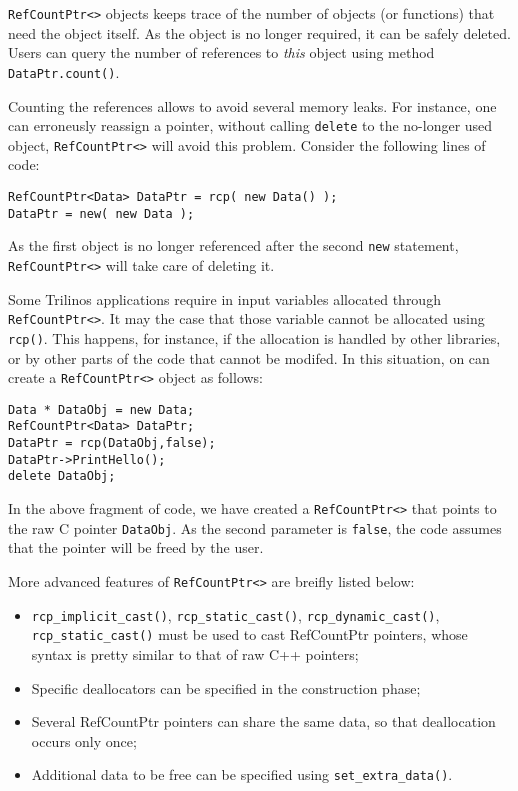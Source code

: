 \verb!RefCountPtr<>! objects keeps trace of the number of objects (or
functions) that need the object itself. As the object is no longer
required, it can be safely deleted. Users can query the number of
references to {\sl this} object using method \verb!DataPtr.count()!.

Counting the references allows to avoid several memory leaks. For
instance, one can erroneusly reassign a pointer, without calling
\verb!delete! to the no-longer used object, \verb!RefCountPtr<>! will
avoid this problem. Consider the following lines of code:
\begin{verbatim}
RefCountPtr<Data> DataPtr = rcp( new Data() );    
DataPtr = new( new Data );
\end{verbatim}
As the first object is no longer referenced after the second \verb!new!
statement, \verb!RefCountPtr<>! will take care of deleting it.

Some Trilinos applications require in input variables allocated through
\verb!RefCountPtr<>!. It may the case that those variable cannot be
allocated using \verb!rcp()!. This happens, for instance, if the
allocation is handled by other libraries, or by other parts of the code
that cannot be modifed. In this situation, on can create a
\verb!RefCountPtr<>! object as follows:
\begin{verbatim}
Data * DataObj = new Data;
RefCountPtr<Data> DataPtr;
DataPtr = rcp(DataObj,false);
DataPtr->PrintHello();
delete DataObj;
\end{verbatim}
In the above fragment of code, we have created a \verb!RefCountPtr<>!
that points to the raw C pointer \verb!DataObj!. As the second parameter
is \verb!false!, the code assumes that the pointer will be freed by the
user. 

More advanced features of \verb!RefCountPtr<>! are breifly listed below:
\begin{itemize}
\item \verb!rcp_implicit_cast()!, \verb!rcp_static_cast()!,
  \verb!rcp_dynamic_cast()!, \verb!rcp_static_cast()! must be used to
  cast RefCountPtr pointers, whose syntax is pretty similar to that of
  raw C++ pointers;
\item Specific deallocators can be specified in the construction phase;
\item Several RefCountPtr pointers can share the same data, so that
  deallocation occurs only once;
\item Additional data to be free can be specified using
  \verb!set_extra_data()!.
\end{itemize}

